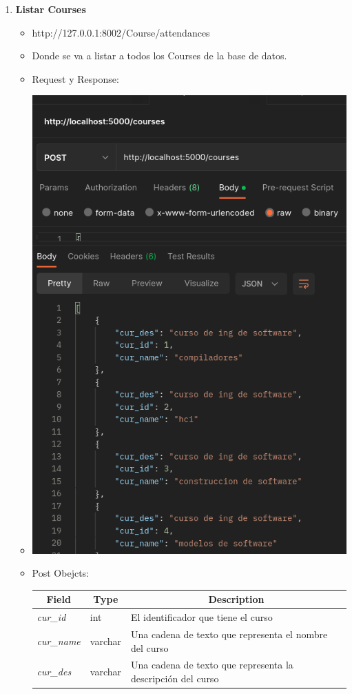 \documentclass{article}
\begin{document}
\begin{enumerate}
    \item \textbf{Listar Courses}
    \begin{itemize}
        \item http://127.0.0.1:8002/Course/attendances
        \item Donde se va a listar a todos los Courses de la base de
        datos.
        \item Request y Response:
        \item \includegraphics[scale=.5]{assets/course/courses.png}
        \item Post Obejcts: 
        \begin{table}[H] \centering \begin{tabular}{|l|l|l|} \hline
        \multicolumn{1}{|c|}{\textbf{Field}} &
        \multicolumn{1}{c|}{\textbf{Type}} &
        \multicolumn{1}{c|}{\textbf{Description}} \\ \hline \textit{cur\_id} &
        int & El identificador que tiene el curso \\ \hline \textit{cur\_name} &
        varchar & Una cadena de texto que representa el nombre del curso \\
        \hline \textit{cur\_des} & varchar & Una cadena de texto que representa
        la descripción del curso \\ \hline \end{tabular} \end{table}
    \end{itemize}


\end{enumerate}
\end{document}

